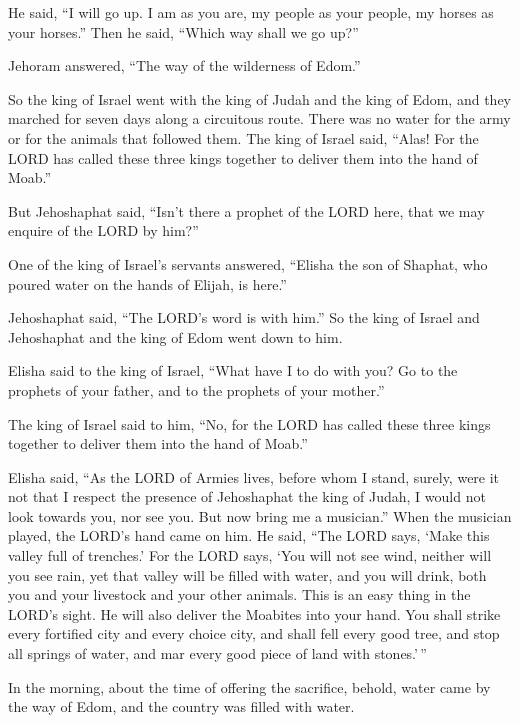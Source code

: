 He said, ``I will go up. I am as you are, my people as your people, my
horses as your horses.''  Then he said, ``Which way shall we
go up?''

Jehoram answered, ``The way of the wilderness of Edom.''

 So the king of Israel went with the king of Judah and the
king of Edom, and they marched for seven days along a circuitous route.
There was no water for the army or for the animals that followed them.
 The king of Israel said, ``Alas! For the LORD has called
these three kings together to deliver them into the hand of Moab.''

 But Jehoshaphat said, ``Isn't there a prophet of the LORD
here, that we may enquire of the LORD by him?''

One of the king of Israel's servants answered, ``Elisha the son of
Shaphat, who poured water on the hands of Elijah, is here.''

 Jehoshaphat said, ``The LORD's word is with him.'' So the
king of Israel and Jehoshaphat and the king of Edom went down to him.

 Elisha said to the king of Israel, ``What have I to do
with you? Go to the prophets of your father, and to the prophets of your
mother.''

The king of Israel said to him, ``No, for the LORD has called these
three kings together to deliver them into the hand of Moab.''

 Elisha said, ``As the LORD of Armies lives, before whom I
stand, surely, were it not that I respect the presence of Jehoshaphat
the king of Judah, I would not look towards you, nor see you.
 But now bring me a musician.'' When the musician played,
the LORD's hand came on him.  He said, ``The LORD says,
`Make this valley full of trenches.'  For the LORD says,
`You will not see wind, neither will you see rain, yet that valley will
be filled with water, and you will drink, both you and your livestock
and your other animals.  This is an easy thing in the
LORD's sight. He will also deliver the Moabites into your hand.
 You shall strike every fortified city and every choice
city, and shall fell every good tree, and stop all springs of water, and
mar every good piece of land with stones.'\,''

 In the morning, about the time of offering the sacrifice,
behold, water came by the way of Edom, and the country was filled with
water.

